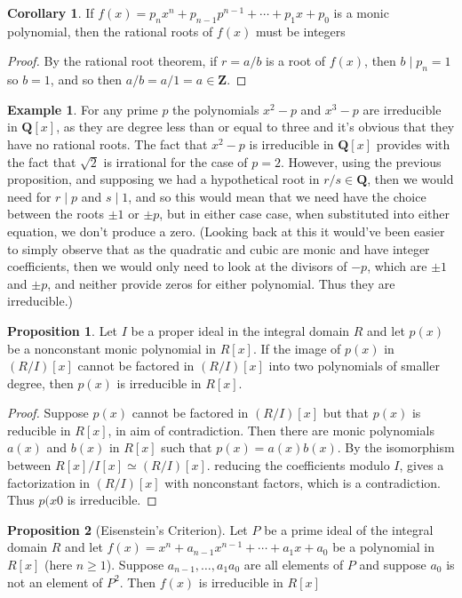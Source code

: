 \documentclass[9pt,reqno]{amsart}
\theoremstyle{definition}
\newtheorem{prop}{Proposition}[section]
\newtheorem{coro}{Corollary}[section]
\newtheorem{ex}{Example}[section]
\newcommand{\zz}{\mathbf Z}
\newcommand{\qq}{\mathbf Q}
\begin{document}
\begin{coro}
If $f(x) = p_nx^n + p_{n-1} p^{n-1} + \cdots + p_1 x+ p_0$ is a monic polynomial, then the rational roots of $f(x)$ must be integers	
\end{coro}
\begin{proof}
	By the rational root theorem, if $r = a/b$ is a root of $f(x)$, then $b \mid p_n =1$ so $b = 1$, and so then $a/b= a/1 = a \in \zz$. 
\end{proof}
\begin{ex}
For any prime $p$ the polynomials $x^2 - p$ and $x^3 - p$ are irreducible in $\qq [x]$, as they are degree less than or equal to three and it's obvious that they have no rational roots. The fact that $x^2 - p$ is irreducible in $\qq[x]$ provides with the fact that $\sqrt{2}$ is irrational for the case of $p=2$. However, using the previous proposition, and supposing we had a hypothetical root in $r/s \in \qq$, then we would need for $r \mid p$ and $s \mid 1$, and so this would mean that we need have the choice between the roots $\pm 1$ or $\pm p$, but in either case case, when substituted into either equation, we don't produce a zero. (Looking back at this it would've been easier to simply observe that as the quadratic and cubic are monic and have integer coefficients, then we would only need to look at the divisors of $-p$, which are $\pm 1$ and $\pm p$, and neither provide zeros for either polynomial. Thus they are irreducible.)
\end{ex}
\begin{prop}
Let $I$ be a proper ideal in the integral domain $R$ and let $p(x)$ be a nonconstant monic polynomial in $R[x]$. If the image of $p(x)$ in $(R/I)[x]$ cannot be factored in $(R/I)[x]$ into two polynomials of smaller degree, then $p(x)$ is irreducible in $R[x]$. 	
\end{prop}
\begin{proof}
	Suppose $p(x)$ cannot be factored in $(R/I)[x]$ but that $p(x)$ is reducible in $R[x]$, in aim of contradiction. Then there are monic polynomials $a(x)$ and $b(x)$ in $R[x]$ such that $p(x) = a(x) b(x)$. By the isomorphism between $R[x]/I[x] \simeq (R/I)[x]$. reducing the coefficients modulo $I$, gives a factorization in $(R/I) [x]$ with nonconstant factors, which is a contradiction. Thus $p(x0$ is irreducible. 
\end{proof}
\begin{prop}[Eisenstein's Criterion] Let $P$ be a prime ideal of the integral domain $R$ and let $f(x) = x^n+ a_{n-1}x^{n-1} + \cdots + a_1 x + a_0$ be a polynomial in $R[x]$ (here $n \geq 1$). Suppose $a_{n-1}, \ldots, a_1 a_0$ are all elements of $P$ and suppose $a_0$ is not an element of $P^2$. Then $f(x)$ is irreducible in $R[x]$
\end{prop}
\end{document}
